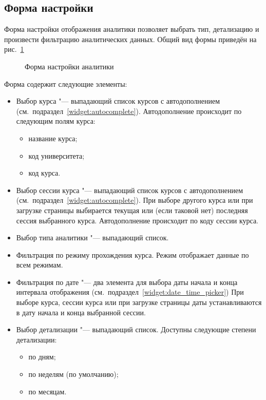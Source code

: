\subsection{Форма настройки}
\label{analytics:form}

Форма настройки отображения аналитики позволяет выбрать тип, детализацию и произвести фильтрацию
аналитических данных. Общий вид формы приведён на рис.~\ref{analytics:form:pic}

\begin{figure}[H]
	\caption{Форма настройки аналитики}
	\label{analytics:form:pic}
\end{figure}

Форма содержит следующие элементы:
\begin{itemize}
	\item Выбор курса "--- выпадающий список курсов с автодополнением (см.\ подраздел~\ref{widget:autocomplete}).
	Автодополнение происходит по следующим полям курса:
	\begin{itemize}
	 	\item название курса;
	 	\item код университета;
	 	\item код курса.
	 \end{itemize}
	\item Выбор сессии курса "--- выпадающий список курсов с автодополнением (см.\ подраздел~\ref{widget:autocomplete}).
	При выборе другого курса или при загрузке страницы выбирается текущая или (если таковой нет) последняя
	сессия выбранного курса. Автодополнение происходит по коду сессии курса.
	\item Выбор типа аналитики "--- выпадающий список.
	\item Фильтрация по режиму прохождения курса. Режим  отображает данные по всем режимам.
	\item Фильтрация по дате "--- два элемента для выбора даты начала и конца интервала отображения (см.\ подраздел~\ref{widget:date_time_picker})
	При выборе курса, сессии курса или при загрузке страницы даты устанавливаются в дату начала и конца выбранной сессии.
	\item Выбор детализации "--- выпадающий список. Доступны следующие степени детализации:
	\begin{itemize}
		\item по дням;
		\item по неделям (по умолчанию);
		\item по месяцам.
	\end{itemize}
\end{itemize}

